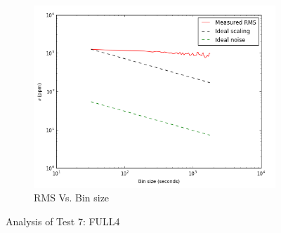 \documentclass{aastex6}
\begin{document}
\begin{figure}[H]
    \begin{subfigure}{3}
        \includegraphics[scale=0.6]{rms_test7}
        \caption{RMS Vs. Bin size}
    \end{subfigure}
    \caption{Analysis of Test 7: FULL4}
\end{figure}
\end{document}
